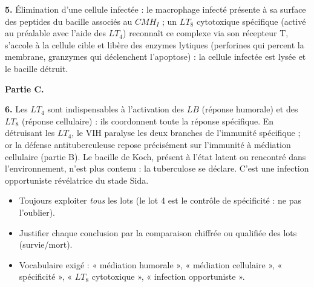 \documentclass[11pt]{article}
\newcommand{\cle}[1]{{\popxbold\color{popdark}#1}}
\begin{document}
\begin{corrige}
\textbf{5.} Élimination d'une cellule infectée : le macrophage infecté présente à sa surface des peptides du bacille associés au $CMH_I$ ; un \cle{$LT_8$ cytotoxique} spécifique (activé au préalable avec l'aide des $LT_4$) reconnaît ce complexe via son récepteur T, s'accole à la cellule cible et libère des enzymes lytiques (perforines qui percent la membrane, granzymes qui déclenchent l'apoptose) : la cellule infectée est lysée et le bacille détruit.

\textbf{Partie C.}

\textbf{6.} Les $LT_4$ sont indispensables à l'activation des $LB$ (réponse humorale) et des $LT_8$ (réponse cellulaire) : ils coordonnent toute la réponse spécifique. En détruisant les $LT_4$, le VIH paralyse les deux branches de l'immunité spécifique ; or la défense antituberculeuse repose précisément sur l'immunité à médiation cellulaire (partie B). Le bacille de Koch, présent à l'état latent ou rencontré dans l'environnement, n'est plus contenu : la tuberculose se déclare. C'est une \cle{infection opportuniste} révélatrice du stade Sida.
\end{corrige}

\begin{attention}
\begin{itemize}
\item Toujours exploiter \emph{tous} les lots (le lot 4 est le contrôle de spécificité : ne pas l'oublier).
\item Justifier chaque conclusion par la comparaison chiffrée ou qualifiée des lots (survie/mort).
\item Vocabulaire exigé : « médiation humorale », « médiation cellulaire », « spécificité », « $LT_8$ cytotoxique », « infection opportuniste ».
\end{itemize}
\end{attention}
\end{document}
